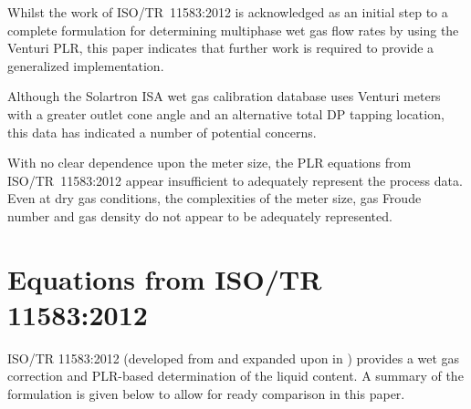 \documentclass[journal]{IEEEtran}
\begin{document}
Whilst the work of ISO/TR~11583:2012 \cite{2012ISO/TRConduits} is acknowledged as an initial step to a complete formulation for determining multiphase wet gas flow rates by using the Venturi \acrfull{PLR}, this paper indicates that further work is required to provide a generalized implementation.

Although the Solartron ISA wet gas calibration database uses Venturi meters with a greater outlet cone angle and an alternative total DP tapping location, this data has indicated a number of potential concerns.

With no clear dependence upon the meter size, the PLR equations from ISO/TR~11583:2012 appear insufficient to adequately represent the process data.  Even at dry gas conditions, the complexities of the meter size, gas Froude number and gas density do not appear to be adequately represented. 



\vfill\eject

%
\appendices
\section{Equations from ISO/TR 11583:2012} \label{11583 Equations}

ISO/TR 11583:2012\cite{2012ISO/TRConduits} (developed from \cite{Reader-Harris2009} and expanded upon in \cite{Reader-Harris2015}) provides a wet gas correction and \acrshort{PLR}-based determination of the liquid content.  A summary of the formulation is given below to allow for ready comparison in this paper.
\end{document}
